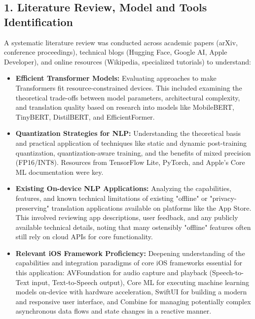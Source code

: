 \documentclass[12pt]{article}
\begin{document}
\subsection*{1. Literature Review, Model and Tools Identification}
A systematic literature review was conducted across academic papers (arXiv, conference proceedings), technical blogs (Hugging Face, Google AI, Apple Developer), and online resources (Wikipedia, specialized tutorials) to understand:
\begin{itemize}
    \item \textbf{Efficient Transformer Models:} Evaluating approaches to make Transformers fit resource-constrained devices. This included examining the theoretical trade-offs between model parameters, architectural complexity, and translation quality based on research into models like MobileBERT, TinyBERT, DistilBERT, and EfficientFormer.
    \item \textbf{Quantization Strategies for NLP:} Understanding the theoretical basis and practical application of techniques like static and dynamic post-training quantization, quantization-aware training, and the benefits of mixed precision (FP16/INT8). Resources from TensorFlow Lite, PyTorch, and Apple's Core ML documentation were key.
    \item \textbf{Existing On-device NLP Applications:} Analyzing the capabilities, features, and known technical limitations of existing "offline" or "privacy-preserving" translation applications available on platforms like the App Store. This involved reviewing app descriptions, user feedback, and any publicly available technical details, noting that many ostensibly "offline" features often still rely on cloud APIs for core functionality.
    \item \textbf{Relevant iOS Framework Proficiency:} Deepening understanding of the capabilities and integration paradigms of core iOS frameworks essential for this application: AVFoundation for audio capture and playback (Speech-to-Text input, Text-to-Speech output), Core ML for executing machine learning models on-device with hardware acceleration, SwiftUI for building a modern and responsive user interface, and Combine for managing potentially complex asynchronous data flows and state changes in a reactive manner.
\end{itemize}
\end{document}
